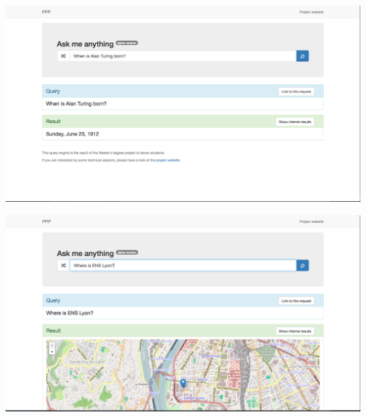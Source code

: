 \begin{frame}[plain]
    \includegraphics[width=\linewidth]{figures/demo-whenIsAlanTuringBorn.png}
\end{frame}

\begin{frame}[plain]
    \includegraphics[width=\linewidth]{figures/demo-whereIsEnsLyon.png}
\end{frame}

